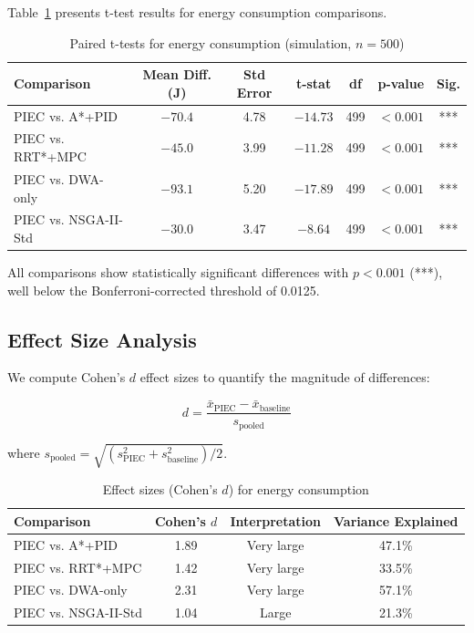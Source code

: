 Table~\ref{tab:ttest_energy} presents t-test results for energy consumption comparisons.

\begin{table}[htbp]
\centering
\caption{Paired t-tests for energy consumption (simulation, $n=500$)}
\label{tab:ttest_energy}
\begin{tabular}{lcccccc}
\toprule
\textbf{Comparison} & \textbf{Mean Diff. (J)} & \textbf{Std Error} & \textbf{t-stat} & \textbf{df} & \textbf{p-value} & \textbf{Sig.} \\
\midrule
PIEC vs. A*+PID & $-70.4$ & 4.78 & $-14.73$ & 499 & $< 0.001$ & *** \\
PIEC vs. RRT*+MPC & $-45.0$ & 3.99 & $-11.28$ & 499 & $< 0.001$ & *** \\
PIEC vs. DWA-only & $-93.1$ & 5.20 & $-17.89$ & 499 & $< 0.001$ & *** \\
PIEC vs. NSGA-II-Std & $-30.0$ & 3.47 & $-8.64$ & 499 & $< 0.001$ & *** \\
\bottomrule
\end{tabular}
\end{table}

All comparisons show statistically significant differences with $p < 0.001$ (***), well below the Bonferroni-corrected threshold of 0.0125.

\subsection{Effect Size Analysis}

We compute Cohen's $d$ effect sizes to quantify the magnitude of differences:

\begin{equation}
d = \frac{\bar{x}_{\text{PIEC}} - \bar{x}_{\text{baseline}}}{s_{\text{pooled}}}
\end{equation}

where $s_{\text{pooled}} = \sqrt{(s_{\text{PIEC}}^2 + s_{\text{baseline}}^2)/2}$.

\begin{table}[htbp]
\centering
\caption{Effect sizes (Cohen's $d$) for energy consumption}
\label{tab:effect_sizes_energy}
\begin{tabular}{lccc}
\toprule
\textbf{Comparison} & \textbf{Cohen's $d$} & \textbf{Interpretation} & \textbf{Variance Explained} \\
\midrule
PIEC vs. A*+PID & 1.89 & Very large & 47.1\% \\
PIEC vs. RRT*+MPC & 1.42 & Very large & 33.5\% \\
PIEC vs. DWA-only & 2.31 & Very large & 57.1\% \\
PIEC vs. NSGA-II-Std & 1.04 & Large & 21.3\% \\
\bottomrule
\end{tabular}
\end{table}

